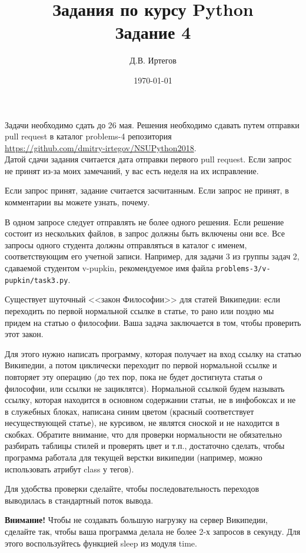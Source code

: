 \documentclass[12pt, a4paper]{article}
\title{Задания по курсу Python\\Задание 4}
\author{Д.В. Иртегов}
\date{\today}
\newcounter{problem}
\newcommand{\problem}[1]{\refstepcounter{problem}{\bf Задача \theproblem.} \ifthenelse{\isempty{#1}{}}{}{\label{#1}}}
\begin{document}
\pagestyle{empty}
\maketitle
{\small Задачи необходимо сдать до 26 мая.  Решения необходимо сдавать путем отправки pull request в каталог problems-4 репозитория \\
\url{https://github.com/dmitry-irtegov/NSUPython2018}. 
\\Датой сдачи задания считается дата отправки первого pull request.  Если запрос не принят из-за моих замечаний, у вас есть неделя на их исправление. 

Если запрос принят, задание считается засчитанным.  Если запрос не принят, в комментарии вы можете узнать, почему.

В одном запросе следует отправлять не более одного решения. Если решение состоит из нескольких файлов, в запрос должны быть включены они все.  Все запросы одного студента должны отправляться в каталог с именем, соответствующим его учетной записи.  Например, для задачи 3 из группы задач 2, сдаваемой студентом v-pupkin, рекомендуемое имя файла \verb|problems-3/v-pupkin/task3.py|. }

\problem{} Существует шуточный <<закон Философии>> для статей Википедии: если переходить по первой нормальной ссылке в статье, то рано или поздно мы придем на статью о философии. Ваша задача заключается в том, чтобы проверить этот закон.

Для этого нужно написать программу, которая получает на вход ссылку на статью Википедии, а потом циклически переходит по первой нормальной ссылке и повторяет эту операцию (до тех пор, пока не будет достигнута статья о философии, или ссылки не зациклятся). Нормальной ссылкой будем называть ссылку, которая находится в основном содержании статьи, не в инфобоксах и не в служебных блоках, написана синим цветом (красный соответствует несуществующей статье), не курсивом, не являтся сноской и не находится в скобках. Обратите внимание, что для проверки нормальности не обязательно разбирать таблицы стилей и проверять цвет и т.п., достаточно сделать, чтобы программа работала для текущей верстки википедии (например, можно использовать атрибут class у тегов).

Для удобства проверки сделайте, чтобы последовательность переходов выводилась в стандартный поток вывода.

{\bf Внимание!} Чтобы не создавать большую нагрузку на сервер Википедии, сделайте так, чтобы ваша программа делала не более 2-х запросов в секунду. Для этого воспользуйтесь функцией sleep из модуля time.
\end{document}
